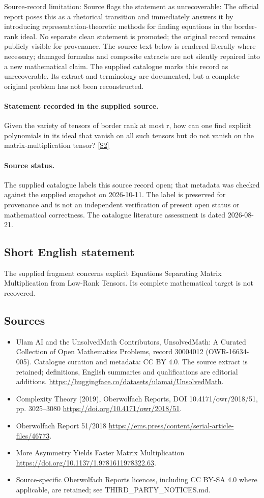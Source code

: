 \documentclass[11pt]{article}
\begin{document}
Source-record limitation: Source flags the statement as unrecoverable: The official report poses this as a rhetorical transition and immediately answers it by introducing representation-theoretic methods for finding equations in the border-rank ideal. No separate clean statement is promoted; the original record remains publicly visible for provenance.
The source text below is rendered literally where necessary; damaged formulas and composite extracts are not silently repaired into a new mathematical claim.
The supplied catalogue marks this record as unrecoverable. Its extract and terminology are documented, but a complete original problem has not been reconstructed.
\paragraph{Statement recorded in the supplied source.}
Given the variety of tensors of border rank at most r, how can one find explicit polynomials in its ideal that vanish on all such tensors but do not vanish on the matrix-multiplication tensor? \href{https://doi.org/10.4171/owr/2018/51}{[S2]}
\paragraph{Source status.}
The supplied catalogue labels this source record open; that metadata was checked against the supplied snapshot on 2026-10-11. The label is preserved for provenance and is not an independent verification of present open status or mathematical correctness. The catalogue literature assessment is dated 2026-08-21.
\subsection{Short English statement}
The supplied fragment concerns explicit Equations Separating Matrix Multiplication from Low-Rank Tensors. Its complete mathematical target is not recovered.
\subsection{Sources}
\begin{itemize}
\item[S1] Ulam AI and the UnsolvedMath Contributors, UnsolvedMath: A Curated Collection of Open Mathematics Problems, record 30004012 (OWR-16634-005). Catalogue curation and metadata: CC BY 4.0. The source extract is retained; definitions, English summaries and qualifications are editorial additions.
\url{https://huggingface.co/datasets/ulamai/UnsolvedMath}.
\item[S2] Complexity Theory (2019), Oberwolfach Reports, DOI 10.4171/owr/2018/51, pp. 3025--3080
\url{https://doi.org/10.4171/owr/2018/51}.
\item[S3] Oberwolfach Report 51/2018
\url{https://ems.press/content/serial-article-files/46773}.
\item[S4] More Asymmetry Yields Faster Matrix Multiplication
\url{https://doi.org/10.1137/1.9781611978322.63}.
\item Source-specific Oberwolfach Reports licences, including CC BY-SA 4.0 where applicable, are retained; see THIRD\_PARTY\_NOTICES.md.
\end{itemize}
\end{document}
